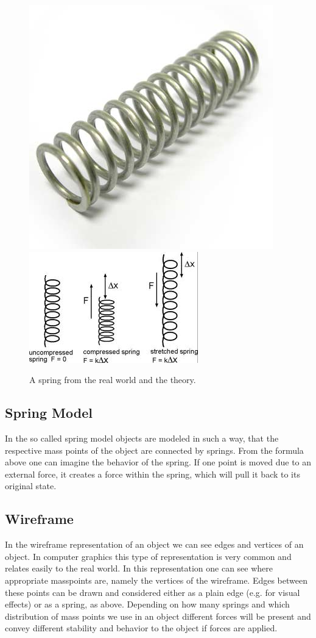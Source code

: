 \documentclass[11pt]{article}
\begin{document}
\begin{figure}[h]
\centering
\includegraphics[scale=0.3]{realspring.jpg}
\includegraphics[scale=0.7]{spring.jpg}
\caption{A spring from the real world and the theory.}
\label{fig:spring-real}
\end{figure}

\subsection{Spring Model}
In the so called spring model objects are modeled in such a way, that the respective mass points of the object are connected by springs. From the formula above one can imagine the behavior of the spring. If one point is moved due to an external force, it creates a force within the spring, which will pull it back to its original state.

\subsection{Wireframe}
In the wireframe representation of an object we can see edges and vertices of an object. In computer graphics this type of representation is very common and relates easily to the real world. In this representation one can see where appropriate masspoints are, namely the vertices of the wireframe. Edges between these points can be drawn and considered either as a plain edge (e.g. for visual effects) or as a spring, as above. Depending on how many springs and which distribution of mass points we use in an object different forces will be present and convey different stability and behavior to the object if forces are applied.
%
%
%
\end{document}
